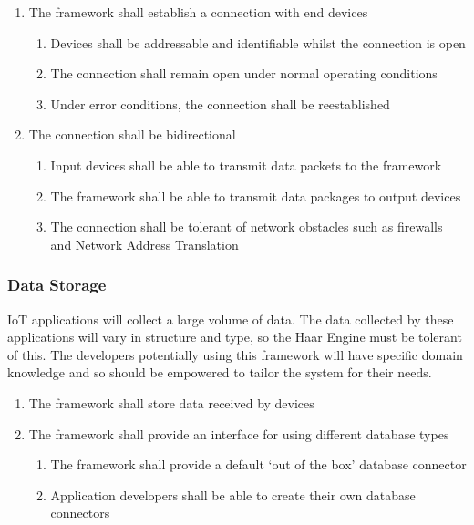         \begin{enumerate}
          \item The framework shall establish a connection with end devices
          \begin{enumerate}
            \item Devices shall be addressable and identifiable whilst the connection is open
            \item The connection shall remain open under normal operating conditions
            \item Under error conditions, the connection shall be reestablished
          \end{enumerate}
          \item The connection shall be bidirectional
          \begin{enumerate}
            \item Input devices shall be able to transmit data packets to the framework
            \item The framework shall be able to transmit data packages to output devices
            \item The connection shall be tolerant of network obstacles such as firewalls and Network Address Translation
          \end{enumerate}
        \end{enumerate}

      \subsubsection{Data Storage}
        IoT applications will collect a large volume of data. The data collected by these applications will vary in structure and type, so the Haar Engine must be tolerant of this. The developers potentially using this framework will have specific domain knowledge and so should be empowered to tailor the system for their needs.

        \begin{enumerate}
          \item The framework shall store data received by devices
          \item The framework shall provide an interface for using different database types
          \begin{enumerate}
            \item The framework shall provide a default `out of the box' database connector
            \item Application developers shall be able to create their own database connectors
          \end{enumerate}
        \end{enumerate}

